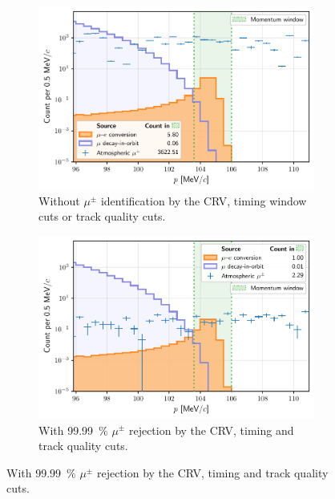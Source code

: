 \begin{figure}
    \centering
        
    \begin{subfigure}[t]{0.49\textwidth}
        \centering
        \includegraphics[width=\textwidth]{
            chapter6/thesis_conversion_search_momentum_distribution_nocuts_v5.pdf}
            \caption{ Without $\mu^\pm$ identification by the CRV, timing window
            cuts or track quality cuts. }
        \label{fig:log_spectrum_nocuts}
    \end{subfigure}
    \hfill
    \begin{subfigure}[t]{0.49\textwidth}
        \centering
        \includegraphics[width=\textwidth]{chapter6/thesis_conversion_search_momentum_distribution_withcuts_except_directionID.pdf}
        \caption{ With \SI{99.99}{\percent} $\mu^\pm$ rejection by the CRV,
        timing and track quality cuts. }
        \label{fig:log_spectrum_cuts_except_directionID}

\end{subfigure}
\end{figure}
